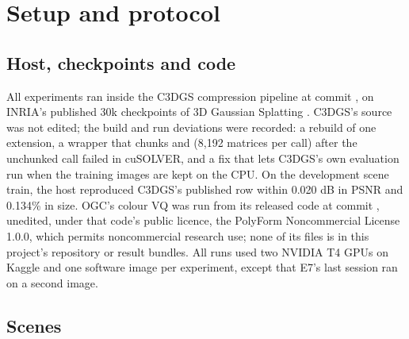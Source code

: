 \section{Setup and protocol}
\label{sec:setup}

\subsection{Host, checkpoints and code}

All experiments ran inside the C3DGS compression pipeline \citep{niedermayr2024compressed} at commit , on INRIA's published 30k checkpoints of 3D Gaussian Splatting \citep{kerbl2023gaussian}. %
C3DGS's source was not edited; the build and run deviations were recorded: a  rebuild of one extension, a wrapper that chunks  and  (8,192 matrices per call) after the unchunked call failed in cuSOLVER, and a fix that lets C3DGS's own evaluation run when the training images are kept on the CPU. %
On the development scene train, the host reproduced C3DGS's published row within 0.020 dB in PSNR and 0.134\% in size. %
OGC's colour VQ \citep{pietroszek2026only} was run from its released code at commit  \citep{pietroszek2026ogccode}, unedited, under that code's public licence, the PolyForm Noncommercial License 1.0.0, which permits noncommercial research use; none of its files is in this project's repository or result bundles. %
All runs used two NVIDIA T4 GPUs on Kaggle and one software image per experiment, except that E7's last session ran on a second image. %

\subsection{Scenes}


